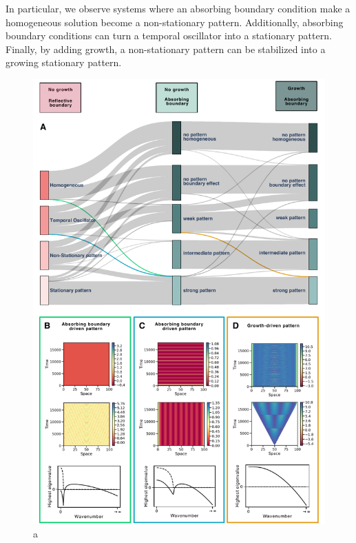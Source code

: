 In particular, we observe systems where an absorbing boundary condition make a homogeneous solution become a non-stationary pattern. Additionally, absorbing boundary conditions can turn a temporal oscillator into a stationary pattern. Finally, by adding growth, a non-stationary pattern can be stabilized into a growing stationary pattern.
\begin{figure}[H]
    \includegraphics[width=1\textwidth]{figures/boundaries_growth} %
    \caption{a}
    \label{fig:boundariesgrowth} %
\end{figure}
